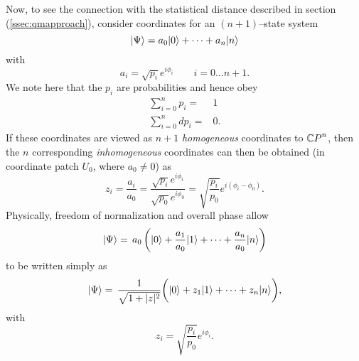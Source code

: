 Now, to see the connection with the statistical distance described
in section (\ref{ssec:qmapproach}),
consider coordinates for an $(n+1)$--state system
\begin{equation}
{|{\Psi}\rangle} = a_0{|{0}\rangle} + \cdots + a_n{|{n}\rangle}
\end{equation} 
with
\begin{equation}
a_i = \sqrt{p_i}e^{i\phi_i}\qquad i=0\ldots n+1.
\end{equation}
We note here that the $p_i$ are probabilities and hence obey
\begin{equation}
\begin{split}
\sum_{i=0}^{n} p_i =& 1\\
\sum_{i=0}^{n} dp_i =& 0.
\end{split}
\end{equation}
If these coordinates are viewed as $n+1$ \emph{homogeneous}
coordinates to ${\mathbb{C} P}^{n}$, then the $n$ corresponding 
\emph{inhomogeneous} coordinates can then be obtained
(in coordinate patch $U_0$, where $a_0\ne 0$) as
\begin{equation}
z_i = \frac{a_i}{a_0} = \frac{ \sqrt{p_i}e^{i\phi_i} }
                             { \sqrt{p_0}e^{i\phi_0} }
= \sqrt{\frac{p_i}{p_0}} e^{i(\phi_i - \phi_0)}.
\label{e:inhomoA}
\end{equation}
Physically, freedom of normalization and overall phase allow
\begin{equation} 
{|{\Psi}\rangle} =\, a_0\left( {|{0}\rangle} + \frac{a_1}{a_0}{|{1}\rangle} + \cdots 
                        + \frac{a_n}{a_0}{|{n}\rangle}
                \right)
\end{equation}
to be written simply as
\begin{equation}
{|{\Psi}\rangle}  =\, \frac{1}{\sqrt{1+|z|^2}}
\biggl(
{|{0}\rangle} + z_1{|{1}\rangle} + \cdots + z_n{|{n}\rangle}
\biggr),
\end{equation}
with
\begin{equation}
z_i = \sqrt{\frac{p_i}{p_0}} e^{i\phi_i}.
\label{e:inhomoB}
\end{equation}

